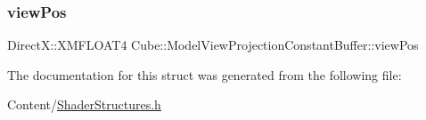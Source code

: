 \mbox{\label{struct_cube_1_1_model_view_projection_constant_buffer_ab67504141f43910f88d78ebebf0f30a0}} 
\subsubsection{\texorpdfstring{view\+Pos}{viewPos}}
{\footnotesize\ttfamily Direct\+X\+::\+X\+M\+F\+L\+O\+A\+T4 Cube\+::\+Model\+View\+Projection\+Constant\+Buffer\+::view\+Pos}



The documentation for this struct was generated from the following file\+:\begin{DoxyCompactItemize}
\item 
Content/\hyperlink{_shader_structures_8h}{Shader\+Structures.\+h}\end{DoxyCompactItemize}

